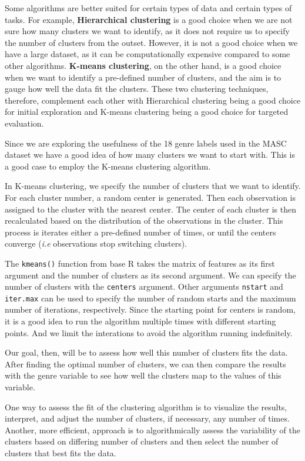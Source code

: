 \documentclass[
  letterpaper,
]{book}
\theoremstyle{definition}
\theoremstyle{remark}
\begin{document}
Some algorithms are better suited for certain types of data and certain
types of tasks. For example, \textbf{Hierarchical clustering} is a good
choice when we are not sure how many clusters we want to identify, as it
does not require us to specify the number of clusters from the outset.
However, it is not a good choice when we have a large dataset, as it can
be computationally expensive compared to some other algorithms.
\textbf{K-means clustering}, on the other hand, is a good choice when we
want to identify a pre-defined number of clusters, and the aim is to
gauge how well the data fit the clusters. These two clustering
techniques, therefore, complement each other with Hierarchical
clustering being a good choice for initial exploration and K-means
clustering being a good choice for targeted evaluation.

Since we are exploring the usefulness of the 18 genre labels used in the
MASC dataset we have a good idea of how many clusters we want to start
with. This is a good case to employ the K-means clustering algorithm.

In K-means clustering, we specify the number of clusters that we want to
identify. For each cluster number, a random center is generated. Then
each observation is assigned to the cluster with the nearest center. The
center of each cluster is then recalculated based on the distribution of
the observations in the cluster. This process is iterates either a
pre-defined number of times, or until the centers converge (\emph{i.e}
observations stop switching clusters).

The \texttt{kmeans()} function from base R takes the matrix of features
as its first argument and the number of clusters as its second argument.
We can specify the number of clusters with the \texttt{centers}
argument. Other arguments \texttt{nstart} and \texttt{iter.max} can be
used to specify the number of random starts and the maximum number of
iterations, respectively. Since the starting point for centers is
random, it is a good idea to run the algorithm multiple times with
different starting points. And we limit the interations to avoid the
algorithm running indefinitely.

Our goal, then, will be to assess how well this number of clusters fits
the data. After finding the optimal number of clusters, we can then
compare the results with the genre variable to see how well the clusters
map to the values of this variable.

One way to assess the fit of the clustering algorithm is to visualize
the results, interpret, and adjust the number of clusters, if necessary,
any number of times. Another, more efficient, approach is to
algorithmically assess the variability of the clusters based on
differing number of clusters and then select the number of clusters that
best fits the data.
\end{document}
